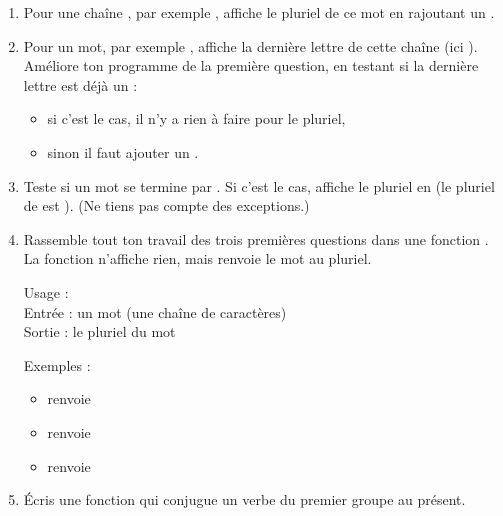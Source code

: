 \documentclass[11pt,class=report,crop=false]{standalone}
\begin{document}
\begin{activite}


\begin{enumerate}
  \item Pour une chaîne , par exemple , affiche le pluriel de ce mot en rajoutant un . 
  
  \item Pour un mot, par exemple , affiche la dernière lettre de cette chaîne (ici ). Améliore ton programme de la première question, en testant si la dernière lettre est déjà un  :
  \begin{itemize}
    \item si c'est le cas, il n'y a rien à faire pour le pluriel,
    \item sinon il faut ajouter un  .
  \end{itemize} 

  \item Teste si un mot se termine par . Si c'est le cas, affiche le pluriel en  (le pluriel de 
  est ). (Ne tiens pas compte des exceptions.)
  
  \item Rassemble tout ton travail des trois premières questions dans une fonction . La fonction n'affiche rien, mais renvoie le mot au pluriel.
  
  \begin{fonction}
  Usage :  \\
  Entrée : un mot (une chaîne de caractères) \\
  Sortie : le pluriel du mot 
  
  \medskip
  
  Exemples : 
  \begin{itemize}
    \item {} renvoie 
    \item {} renvoie   
    \item {} renvoie          
  \end{itemize}     
  \end{fonction}

  \item Écris une fonction  qui conjugue un verbe du premier groupe au présent.
  

\end{enumerate}
\end{activite}
\end{document}
